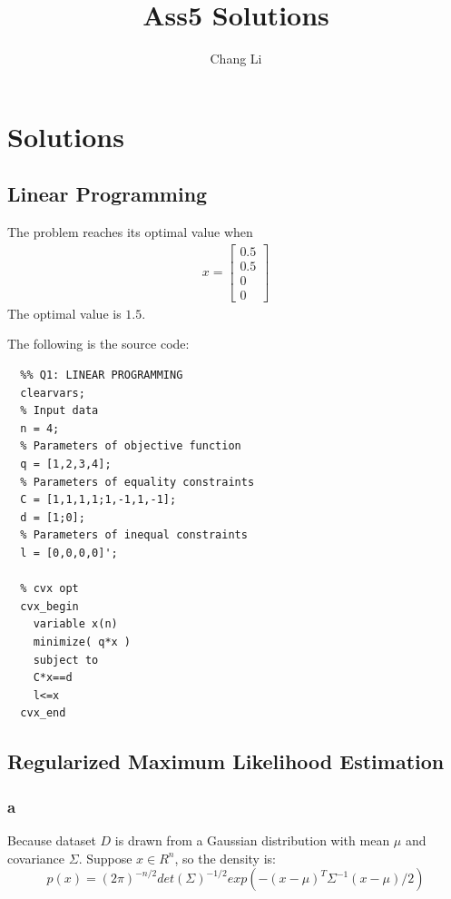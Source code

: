 \documentclass[10pt,a4paper]{article}
\begin{document}
\title{Ass5 Solutions}
\author{Chang Li}
\maketitle

\section{Solutions}

\subsection{Linear Programming}
The problem reaches its optimal value when
\begin{align*}
  x=\begin{bmatrix}
    0.5\\
    0.5\\
    0\\
    0
  \end{bmatrix}
\end{align*}
The optimal value is $1.5$.

The following is the source code:
\begin{lstlisting}
  %% Q1: LINEAR PROGRAMMING
  clearvars;
  % Input data
  n = 4;
  % Parameters of objective function
  q = [1,2,3,4];
  % Parameters of equality constraints
  C = [1,1,1,1;1,-1,1,-1];
  d = [1;0];
  % Parameters of inequal constraints
  l = [0,0,0,0]';

  % cvx opt
  cvx_begin
    variable x(n)
    minimize( q*x )
    subject to
    C*x==d
    l<=x
  cvx_end
\end{lstlisting}

\subsection{Regularized Maximum Likelihood Estimation}

\subsubsection{a}
Because dataset $D$ is drawn from a Gaussian distribution
with mean $\mu$ and covariance $\Sigma$. Suppose $x\in R^n$,
so the density is:
$$p(x) = (2\pi)^{-n/2}det(\Sigma)^{-1/2}exp(-(x-\mu)^T\Sigma^{-1}(x-\mu)/2)$$
\end{document}
